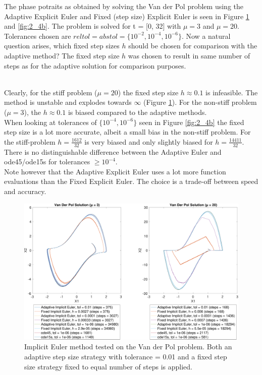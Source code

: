 The phase potraits as obtained by solving the Van der Pol problem using the Adaptive Explicit Euler and Fixed (step size) Explicit Euler is seen in Figure \ref{fig:2_4a} and \ref{fig:2_4b}. The problem is solved for t = [0, 32] with $\mu = 3$ and $\mu =20$. Tolerances chosen are $reltol = abstol = \{10^{-2}, 10^{-4}, 10^{-6}\}$. Now a natural question arises, which fixed step sizes $h$ should be chosen for comparison with the adaptive method? The fixed step size $h$ was chosen to result in same number of steps as for the adaptive solution for comparison purposes.

\\
Clearly, for the stiff problem ($\mu = 20$) the fixed step size $h \approx 0.1$ is infeasible. The method is unstable and explodes towards $\infty$ (Figure \ref{fig:2_4a}). For the non-stiff problem ($\mu = 3$), the $h \approx 0.1$ is biased compared to the adaptive methods.
\\

When looking at tolerances of $\{10^{-4}, 10^{-6}\}$ seen in Figure \ref{fig:2_4b} the fixed step size is a lot more accurate, albeit a small bias in the non-stiff problem. For the stiff-problem $h=\frac{1612}{32}$ is very biased and only slightly biased for $h=\frac{14411}{32}$. There is no distinguishable difference between the Adaptive Euler and ode45/ode15s for tolerances $\geq 10^{-4}$.
\\

Note however that the Adaptive Explicit Euler uses a lot more function evaluations than the Fixed Explicit Euler. The choice is a trade-off between speed and accuracy.

\begin{figure}
    \centering
    \includegraphics[width=\textwidth]{plots/3_4main.pdf}
    \caption{Implicit Euler method tested on the Van der Pol problem. Both an adaptive step size strategy with tolerance = 0.01 and a fixed step size strategy fixed to equal number of steps is applied.}
    \label{fig:2_4a}
\end{figure}


